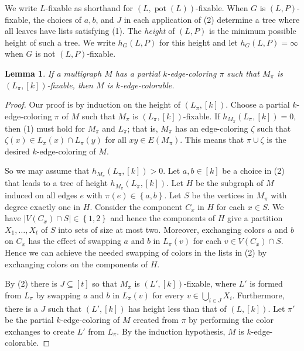 \documentclass[12pt]{article}
\theoremstyle{plain}
\newtheorem{lem}[thm]{Lemma}
\theoremstyle{definition}
\theoremstyle{remark}
\newcommand{\set}[1]{\left\{ #1 \right\}}
\newcommand{\card}[1]{\left|#1\right|}
\newcommand{\irange}[1]{\left[#1\right]}
\newcommand{\parens}[1]{\left( #1 \right)}
\newcommand{\pot}{\operatorname{pot}}
\begin{document}
We write $L$-fixable as shorthand for $(L, \pot(L))$-fixable. When $G$ is $(L,
P)$-fixable, the choices of $a,b$, and $J$ in each application of (2) determine
a tree where all leaves have lists satisfying (1).  The \emph{height} of $(L,
P)$ is the minimum possible height of such a tree.  We write $h_G(L, P)$ for
this height and let $h_G(L, P) = \infty$ when $G$ is not $(L,P)$-fixable. 

\begin{lem}\label{FixableCompletesColoring}
If a multigraph $M$ has a partial $k$-edge-coloring $\pi$ such that $M_\pi$ is $(L_\pi, \irange{k})$-fixable, then $M$ is $k$-edge-colorable.
\end{lem}
\begin{proof}
Our proof is by induction on the height of $(L_\pi,[k])$.
Choose a partial $k$-edge-coloring $\pi$ of $M$ such that $M_\pi$ is $(L_\pi,
\irange{k})$-fixable. %
If $h_{M_\pi}\parens{L_\pi, \irange{k}} = 0$, then (1) must hold for $M_\pi$
and $L_\pi$; that is, $M_\pi$ has an edge-coloring $\zeta$ such that $\zeta(x)
\in L_\pi(x) \cap L_\pi(y)$ for all $xy \in E(M_\pi)$.  This means that
$\pi \cup \zeta$ is the desired $k$-edge-coloring of $M$.  

So we may assume that $h_{M_\pi}\parens{L_\pi, \irange{k}} > 0$.  Let $a,b \in
\irange{k}$ be a choice in (2) that leads to a tree of height
$h_{M_\pi}\parens{L_\pi, \irange{k}}$.  Let $H$ be the subgraph of $M$ induced
on all edges $e$ with $\pi(e) \in \set{a,b}$.  Let $S$ be the vertices in
$M_\pi$ with degree exactly one in $H$.  Consider the component $C_x$ in $H$
for each $x \in S$.  We have $\card{V(C_x) \cap S} \in \set{1,2}$ and hence the
components of $H$ give a partition $X_1, \ldots, X_t$ of $S$ into sets of size
at most two.  Moreover, exchanging colors $a$ and $b$ on $C_x$ has the effect
of swapping $a$ and $b$ in $L_\pi(v)$ for each $v \in V(C_x) \cap S$.  Hence we
can achieve the needed swapping of colors in the lists in (2) by exchanging
colors on the components of $H$.  

By (2) there is $J \subseteq \irange{t}$ so
that $M_\pi$ is $(L', \irange{k})$-fixable, where $L'$ is formed from $L_\pi$ by
swapping $a$ and $b$ in $L_\pi(v)$ for every $v \in \bigcup_{i \in J} X_i$. 
Furthermore, there is a $J$ such that $(L',[k])$ has height less than that of
$(L,[k])$.
Let $\pi'$ be the partial $k$-edge-coloring of $M$ created from
$\pi$ by performing the color exchanges to create $L'$ from $L_\pi$.  
By the induction hypothesis, $M$ is $k$-edge-colorable.
\end{proof}
\end{document}
